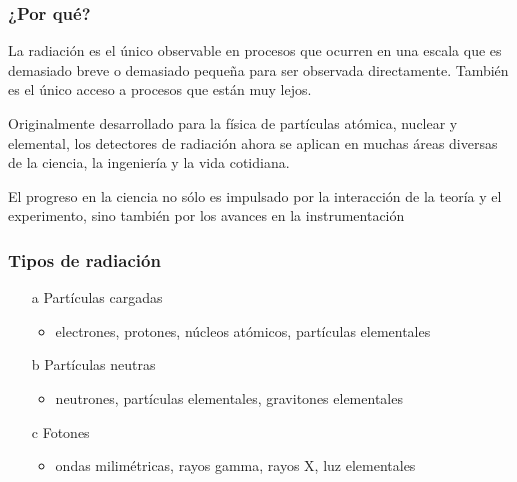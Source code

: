 \documentclass{beamer}
\begin{document}
\begin{frame}
\frametitle{¿Por qué?}
{
\begin{block}{}
La radiación es el único {\color{red}observable} en procesos que ocurren en una escala que es
demasiado breve o demasiado pequeña para ser observada directamente. También es
el único acceso a procesos que están muy lejos.
\end{block}
}
\begin{block}{}
Originalmente desarrollado para la física de partículas atómica, nuclear y
elemental, los detectores de radiación ahora se aplican en muchas áreas diversas
de la ciencia, la ingeniería y la vida cotidiana.
\end{block}
{
\begin{block}{}
El progreso en la ciencia no sólo es impulsado por la interacción de la teoría y
el experimento, sino también por los avances en la {\color{blue}instrumentación}
\end{block}
}
\end{frame}

\begin{frame}
\frametitle{Tipos de radiación}
\begin{alertblock}{}
\begin{itemize}
\item[a] Partículas cargadas 
\begin{itemize}
\item {\color{blue}electrones, protones, núcleos atómicos, partículas
elementales} 
\end{itemize}
\item[b] Partículas neutras 
				\begin{itemize}
\item {\color{blue}neutrones, partículas elementales, gravitones
elementales} 
				\end{itemize}
\item[c] Fotones 
				\begin{itemize}
\item {\color{blue}ondas milimétricas, rayos gamma, rayos X, luz
elementales} 
				\end{itemize}
				\end{itemize}
				\end{alertblock}
				\end{frame}
\end{document}
